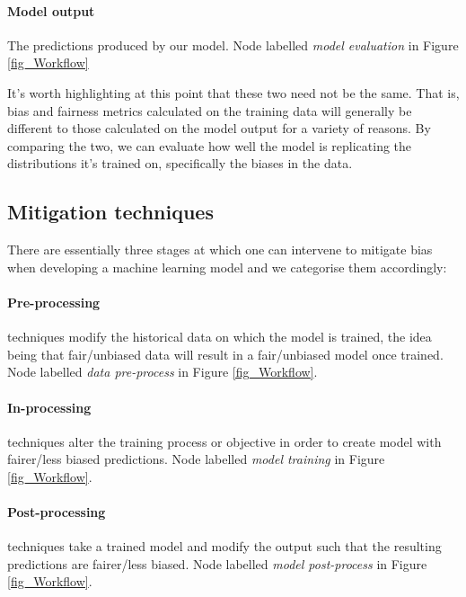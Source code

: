 \paragraph*{Model output} The predictions produced by our model. Node labelled \emph{model evaluation} in Figure \ref{fig_Workflow}
\newline

It's worth highlighting at this point that these two need not be the same. That is, bias and fairness metrics calculated on the training data will generally be different to those calculated on the model output for a variety of reasons. By comparing the two, we can evaluate how well the model is replicating the distributions it's trained on, specifically the biases in the data.

\subsection{Mitigation techniques}

There are essentially three stages at which one can intervene to mitigate bias when developing a machine learning model and we categorise them accordingly:
%
\paragraph*{Pre-processing} techniques modify the historical data on which the model is trained, the idea being that fair/unbiased data will result in a fair/unbiased model once trained. Node labelled \emph{data pre-process} in Figure \ref{fig_Workflow}.
%
\paragraph*{In-processing} techniques alter the training process or objective in order to create model with fairer/less biased predictions. Node labelled \emph{model training} in Figure \ref{fig_Workflow}.
%
\paragraph*{Post-processing} techniques take a trained model and modify the output such that the resulting predictions are fairer/less biased. Node labelled \emph{model post-process} in Figure \ref{fig_Workflow}.

